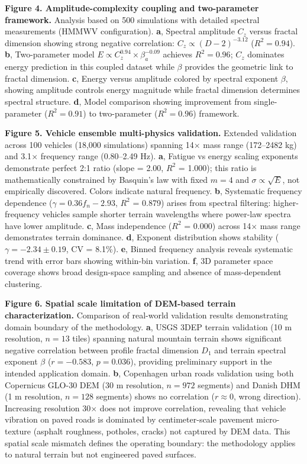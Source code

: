\documentclass[11pt]{article}
\begin{document}
\textbf{Figure 4. Amplitude-complexity coupling and two-parameter framework.} 
Analysis based on 500 simulations with detailed spectral measurements (HMMWV configuration). 
\textbf{a}, Spectral amplitude $C_z$ versus fractal dimension showing strong negative correlation: $C_z \propto (D-2)^{-3.12}$ ($R^2 = 0.94$). 
\textbf{b}, Two-parameter model $E \propto C_z^{0.94} \times \beta_a^{-0.09}$ achieves $R^2 = 0.96$; $C_z$ dominates energy prediction in this coupled dataset while $\beta$ provides the geometric link to fractal dimension. 
\textbf{c}, Energy versus amplitude colored by spectral exponent $\beta$, showing amplitude controls energy magnitude while fractal dimension determines spectral structure. 
\textbf{d}, Model comparison showing improvement from single-parameter ($R^2 = 0.91$) to two-parameter ($R^2 = 0.96$) framework.

\textbf{Figure 5. Vehicle ensemble multi-physics validation.} 
Extended validation across 100 vehicles (18,000 simulations) spanning 14$\times$ mass range (172--2482 kg) and 3.1$\times$ frequency range (0.80--2.49 Hz). 
\textbf{a}, Fatigue vs energy scaling exponents demonstrate perfect 2:1 ratio (slope = 2.00, $R^2$ = 1.000); this ratio is mathematically constrained by Basquin's law with fixed $m = 4$ and $\sigma \propto \sqrt{E}$, not empirically discovered. Colors indicate natural frequency. 
\textbf{b}, Systematic frequency dependence ($\gamma = 0.36 f_n - 2.93$, $R^2$ = 0.879) arises from spectral filtering: higher-frequency vehicles sample shorter terrain wavelengths where power-law spectra have lower amplitude. 
\textbf{c}, Mass independence ($R^2$ = 0.000) across 14$\times$ mass range demonstrates terrain dominance. 
\textbf{d}, Exponent distribution shows stability ($\gamma = -2.34 \pm 0.19$, CV = 8.1\%). 
\textbf{e}, Binned frequency analysis reveals systematic trend with error bars showing within-bin variation. 
\textbf{f}, 3D parameter space coverage shows broad design-space sampling and absence of mass-dependent clustering.

\textbf{Figure 6. Spatial scale limitation of DEM-based terrain characterization.} 
Comparison of real-world validation results demonstrating domain boundary of the methodology. 
\textbf{a}, USGS 3DEP terrain validation (10 m resolution, $n=13$ tiles) spanning natural mountain terrain shows significant negative correlation between profile fractal dimension $D_1$ and terrain spectral exponent $\beta$ ($r = -0.583$, $p = 0.036$), providing preliminary support in the intended application domain. 
\textbf{b}, Copenhagen urban roads validation using both Copernicus GLO-30 DEM (30 m resolution, $n=972$ segments) and Danish DHM (1 m resolution, $n=128$ segments) shows no correlation ($r \approx 0$, wrong direction). Increasing resolution 30$\times$ does not improve correlation, revealing that vehicle vibration on paved roads is dominated by centimeter-scale pavement micro-texture (asphalt roughness, potholes, cracks) not captured by DEM data. This spatial scale mismatch defines the operating boundary: the methodology applies to natural terrain but not engineered paved surfaces.
\end{document}

